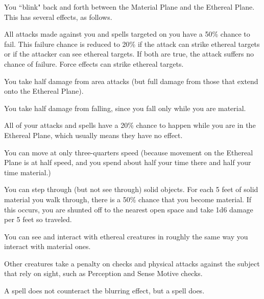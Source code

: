 \spellrng{\rngpers}
\begin{spelleffect}
  You ``blink" back and forth between the Material Plane and the Ethereal Plane. This has several effects, as follows.
  \begin{itemize*}
    \item All attacks made against you and spells targeted on you have a 50\% chance to fail. This failure chance is reduced to 20\% if the attack can strike ethereal targets or if the attacker can see ethereal targets. If both are true, the attack suffers no chance of failure. Force effects can strike ethereal targets.
    \item You take half damage from area attacks (but full damage from those that extend onto the Ethereal Plane).
    \item You take half damage from falling, since you fall only while you are material.
    \item All of your attacks and spells have a 20\% chance to happen while you are in the Ethereal Plane, which usually means they have no effect.
    \item You can move at only three-quarters speed (because movement on the Ethereal Plane is at half speed, and you spend about half your time there and half your time material.)
    \item You can step through (but not see through) solid objects. For each 5 feet of solid material you walk through, there is a 50\% chance that you become material. If this occurs, you are shunted off to the nearest open space and take 1d6 damage per 5 feet so traveled. 
    \item You can see and interact with ethereal creatures in roughly the same way you interact with material ones.
  \end{itemize*}
\end{spelleffect}

\spellrng{\rngclose}
\begin{spelleffect}
    Other creatures take a  penalty on checks and physical attacks against the subject that rely on sight, such as Perception and Sense Motive checks.
\end{spelleffect}
\begin{spellnotes}
  A  spell does not counteract the blurring effect, but a  spell does.
\end{spellnotes}

